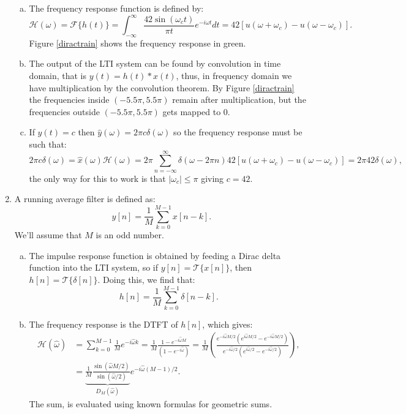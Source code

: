 \begin{enumerate}
\begin{enumerate}[a)]
          \item The frequency response function is defined by:
                \[ \mathcal{H}(\omega)=\mathcal{F}\{h(t)\}=\int_{-\infty}^{\infty}\frac{42\sin(\omega_{c}t)}{\pi t}e^{-i\omega t}dt=42[u(\omega+\omega_{c})-u(\omega-\omega_{c})]. \]
                Figure \ref{diractrain} shows the frequency response in green.

          \item The output of the LTI system can be found by convolution in 
                time domain, that is $y(t)=h(t)*x(t)$, thus,
                in frequency domain we have multiplication by the convolution theorem. 
                By Figure \ref{diractrain} the frequencies inside $(-5.5\pi,5.5\pi)$ 
                remain after multiplication, but the frequencies 
                outside $(-5.5\pi,5.5\pi)$ gets mapped to $0$.

          \item If $y(t)=c$ then $\hat{y}(\omega)=2\pi c\delta(\omega)$ so the frequency response must be such that:
                \[ 2\pi c\delta(\omega)=\hat{x}(\omega)\mathcal{H}(\omega)=2\pi\sum_{n=-\infty}^{\infty}\delta(\omega-2\pi n)42[u(\omega+\omega_{c})-u(\omega-\omega_{c})]=2\pi42\delta(\omega), \]
                the only way for this to work is that $|\omega_{c}|\le\pi$ giving $c=42$.
        \end{enumerate}

  \item A running average filter is defined as:
        \[ y[n]=\frac{1}{M}\sum_{k=0}^{M-1}x[n-k]. \]
        We'll assume that $M$ is an odd number.

        \begin{enumerate}[a)]
          \item The impulse response function is obtained by feeding a Dirac delta function into 
                the LTI system, so if $y[n]=\mathcal{T}\{x[n]\}$,
                then $h[n]=\mathcal{T}\{\delta[n]\}$. Doing this, we find that:
                \[ h[n]=\frac{1}{M}\sum_{k=0}^{M-1}\delta[n-k]. \]

          \item The frequency response is the DTFT of $h[n]$, which gives:
                \begin{align*}
                  \mathcal{H}(\hat{\omega}) & =\sum_{k=0}^{M-1}\frac{1}{M}e^{-i\hat{\omega}k}=\frac{1}{M}\frac{1-e^{-i\hat{\omega}M}}{(1-e^{-i\hat{\omega}})}
                  =\frac{1}{M}\left(\frac{e^{-i\hat{\omega}M/2}(e^{i\hat{\omega}M/2}-e^{-i\hat{\omega}M/2})}{e^{-i\hat{\omega}/2}(e^{i\hat{\omega}/2}-e^{-i\hat{\omega}/2})}\right), \\
                                            & =\underbrace{\frac{1}{M}\frac{\sin(\hat{\omega}M/2)}{\sin(\hat{\omega}/2)}}_{D_{M}(\hat{\omega})}e^{-i\hat{\omega}(M-1)/2}.
                \end{align*}
                The sum, is evaluated using known formulas for geometric sums.


\end{enumerate}
\end{enumerate}
